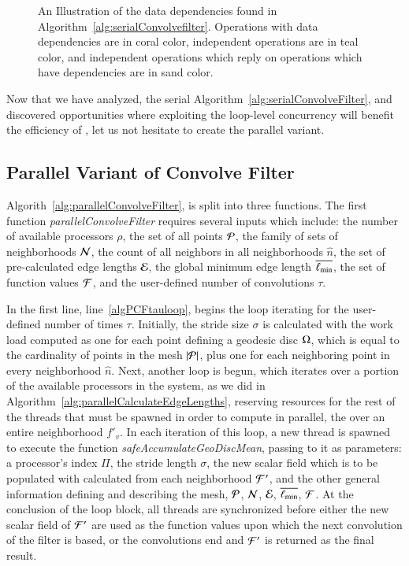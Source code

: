 \begin{figure}[ht]
	
	{\caption[Data Dependencies in Serial Algorithm~\ref{alg:serialConvolvefilter}: Calculate Edge Lengths]{An Illustration of the data dependencies found in Algorithm~\ref{alg:serialConvolvefilter}. Operations with data dependencies are in coral color, independent operations are in teal color, and independent operations which reply on operations which have dependencies are in sand color.}\label{fig:sacfDataDependencies}}
\end{figure}

Now that we have analyzed, the serial Algorithm~\ref{alg:serialConvolveFilter}, and discovered opportunities where exploiting the loop-level concurrency will benefit the efficiency of , let us not hesitate to create the parallel variant.

%
%
\subsection{Parallel Variant of Convolve Filter}
\label{ch6sCFPssPRCN}
Algorith~\ref{alg:parallelConvolveFilter}, is split into three functions. The first function \textit{parallelConvolveFilter} requires several inputs which include: the number of available processors $\rho$, the set of all points $\mathcal{P}$, the family of sets of neighborhoods $\mathcal{N}$, the count of all neighbors in all neighborhoods $\hat{n}$, the set of pre-calculated edge lengths $\mathcal{E}$, the global minimum edge length $\overline{\ell_\text{min}}$, the set of function values $\mathcal{F}$, and the user-defined number of convolutions $\tau$.

In the first line, line~\ref{algPCFtauloop}, begins the loop iterating for the user-defined number of times $\tau$. Initially, the stride size $\sigma$ is calculated with the work load computed as one for each point defining a geodesic disc $\Omega$, which is equal to the cardinality of points in the mesh $|\mathcal{P}|$, plus one for each neighboring point in every neighborhood $\hat{n}$. Next, another loop is begun, which iterates over a portion of the available processors in the system, as we did in Algorithm~\ref{alg:parallelCalculateEdgeLengths}, reserving resources for the rest of the threads that must be spawned in order to compute in parallel, the \wmfv{} over an entire neighborhood $f'_v$. In each iteration of this loop, a new thread is spawned to execute the function \textit{safeAccumulateGeoDiscMean}, passing to it as parameters: a processor's index $\Pi$, the stride length $\sigma$, the new scalar field which is to be populated with calculated  from each neighborhood $\mathcal{F}'$, and the other general information defining and describing the mesh, $\mathcal{P}$, $\mathcal{N}$, $\mathcal{E}$, $\overline{\ell_\text{min}}$, $\mathcal{F}$. At the conclusion of the loop block, all threads are synchronized before either the new scalar field of  $\mathcal{F}'$ are used as the function values upon which the next convolution of the filter is based, or the convolutions end and $\mathcal{F}'$ is returned as the final result.

